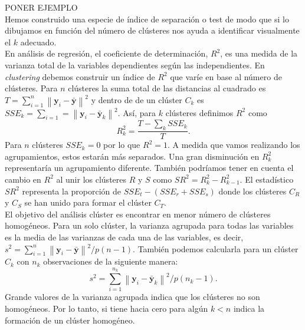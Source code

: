 \documentclass[a4paper, 20pt]{article}
\newcommand{\norm}[1]{\left\lVert#1\right\rVert}
\newcommand{\yy}{\textbf{y}}
\begin{document}
PONER EJEMPLO \\

Hemos construido una especie de índice de separación o test de modo que si lo dibujamos en función del número de clústeres nos ayuda a identificar visualmente el $ k $ adecuado. \\

En análisis de regresión, el coeficiente de determinación, $ R^2 $, es una medida de la varianza total de la variables dependientes según las independientes. En \textit{clustering} debemos construir un índice de $ R^2 $ que varíe en base al número de clústeres. Para $ n $ clústeres la suma total de las distancias al cuadrado es $ T = \sum_{i = 1}^{n} \norm{\yy_i - \bar{\yy}}^2 $ y dentro de de un clúster $ C_k $ es $ SSE_k = \sum_{i = 1}^{} = \norm{\yy_i - \bar{\yy}_k}^2$. Así, para $ k $ clústeres definimos $ R^2 $ como
\[
R^{2}_{k} = \frac{T - \sum_k SSE_k}{T}.
\]
Para $ n $ clústeres $ SSE_k = 0 $ por lo que $ R^2 = 1 $. A medida que vamos realizando los agrupamientos, estos estarán más separados. Una gran disminución en $ R^2_k $ representaría un agrupamiento diferente. También podríamos tener en cuenta el cambio en $ R^2 $ al unir los clústeres $ R $ y $ S $ como $ SR^2 = R_k^2 - R^2_{k-1} $. El estadístico $ SR^2 $ representa la proporción de $ SSE_t - (SSE_r + SSE_s) $ donde los clústeres $ C_R $ y $ C_S $ se han unido para formar el clúster $ C_T $.  \\

El objetivo del análisis clúster es encontrar en menor número de clústeres homogéneos. Para un solo clúster, la varianza agrupada para todas las variables es la media de las varianzas de cada una de las variables, es decir, $ s^2 = \sum_{i=1}^{n} \norm{\yy_i - \bar{\yy}}^2/ p(n-1)$. También podemos calcularla para un clúster $ C_k $ con $ n_k $ observaciones de la siguiente manera:
\[
s^2 = \sum_{i=1}^{n_k} \norm{\yy_i - \bar{\yy}_k}^2/ p(n_k-1).
\]
Grande valores de la varianza agrupada indica que los clústeres no son homogéneos. Por lo tanto, si tiene hacia cero para algún $  k < n $ indica la formación de un clúster homogéneo. \\
\end{document}
